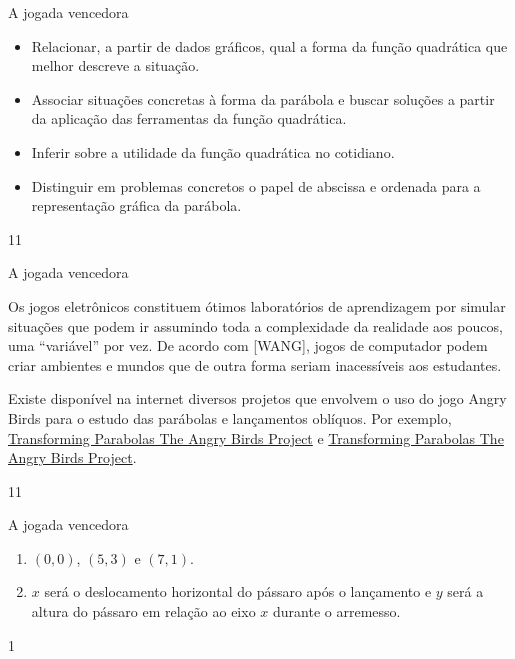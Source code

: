 \begin{objectives}{A jogada vencedora}
{
\begin{itemize}
\item Relacionar, a partir de dados gráficos, qual a forma da função quadrática que melhor descreve a situação.

\item {} 
Associar situações concretas à forma da parábola e buscar soluções a partir da aplicação das ferramentas da função quadrática.

\item {} 
Inferir sobre a utilidade da função quadrática no cotidiano.

\item {} 
Distinguir em problemas concretos o papel de abscissa e ordenada para a representação gráfica da parábola.
\end{itemize}
}{1}{1}
\end{objectives}
\begin{sugestions}{A jogada vencedora}
{
Os jogos eletrônicos constituem ótimos laboratórios de aprendizagem por simular situações que podem ir assumindo toda a complexidade da realidade aos poucos, uma “variável” por vez. De acordo com {[}WANG{]}, jogos de computador podem criar ambientes e mundos que de outra forma seriam inacessíveis aos estudantes.

Existe disponível na internet diversos projetos que envolvem o uso do jogo Angry Birds para o estudo das parábolas e lançamentos oblíquos. Por exemplo, \href{https://algebra2coach.com/transforming-parabolas-angry-birds-project/}{Transforming Parabolas \textendash{} The Angry Birds Project} e \href{https://www.tes.com/teaching-resource/angry-bird-parabolas-graphing-quadratic-equations-6165424}{Transforming Parabolas \textendash{} The Angry Birds Project}.
}{1}{1}
\end{sugestions}
\begin{answer}{A jogada vencedora}
{
\begin{enumerate}
\item {} 
\((0,0)\), \((5,3)\) e \((7,1)\).

\item {} 
\(x\) será o deslocamento horizontal do pássaro após o lançamento e \(y\) será a altura do pássaro em relação ao eixo \(x\) durante o arremesso.
\end{enumerate}
}{1}
\end{answer}
\clearmargin
